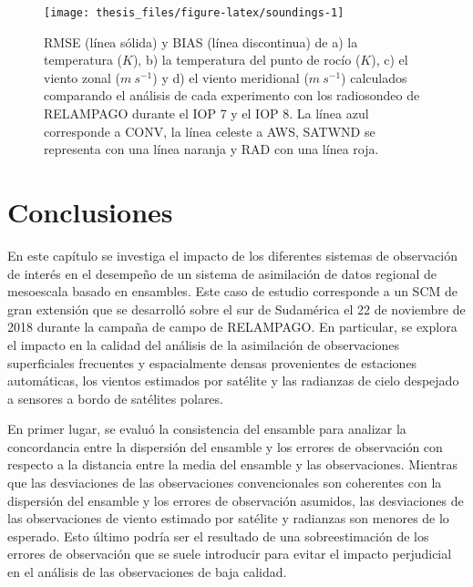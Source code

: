 \documentclass[12pt,oneside,a4paper]{reedthesis}
\begin{document}
\begin{figure}

{\centering \texttt{[image: thesis\_files/figure-latex/soundings-1]} 

}

\caption{RMSE (línea sólida) y BIAS (línea discontinua) de a) la temperatura (\(K\)), b) la temperatura del punto de rocío (\(K\)), c) el viento zonal (\(m\ s^{-1}\)) y d) el viento meridional (\(m\ s^{-1}\)) calculados comparando el análisis de cada experimento con los radiosondeo de RELAMPAGO durante el IOP 7 y el IOP 8. La línea azul corresponde a CONV, la línea celeste a AWS, SATWND se representa con una línea naranja y RAD con una línea roja.}\label{fig:soundings}
\end{figure}
\hypertarget{conclusiones}{%
\section{Conclusiones}\label{conclusiones}}

En este capítulo se investiga el impacto de los diferentes sistemas de observación de interés en el desempeño de un sistema de asimilación de datos regional de mesoescala basado en ensambles. Este caso de estudio corresponde a un SCM de gran extensión que se desarrolló sobre el sur de Sudamérica el 22 de noviembre de 2018 durante la campaña de campo de RELAMPAGO. En particular, se explora el impacto en la calidad del análisis de la asimilación de observaciones superficiales frecuentes y espacialmente densas provenientes de estaciones automáticas, los vientos estimados por satélite y las radianzas de cielo despejado a sensores a bordo de satélites polares.

En primer lugar, se evaluó la consistencia del ensamble para analizar la concordancia entre la dispersión del ensamble y los errores de observación con respecto a la distancia entre la media del ensamble y las observaciones. Mientras que las desviaciones de las observaciones convencionales son coherentes con la dispersión del ensamble y los errores de observación asumidos, las desviaciones de las observaciones de viento estimado por satélite y radianzas son menores de lo esperado. Esto último podría ser el resultado de una sobreestimación de los errores de observación que se suele introducir para evitar el impacto perjudicial en el análisis de las observaciones de baja calidad.
\end{document}
